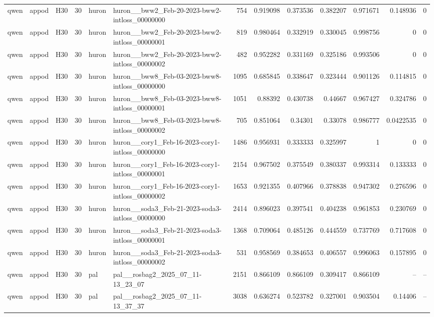 \begin{longtable}{lllrllrrrrrrr}
qwen & appod & H30 & 30 & huron & huron\_\_bww2\_Feb-20-2023-bww2-intloss\_00000000 & 754 & 0.919098 & 0.373536 & 0.382207 & 0.971671 & 0.148936 & 0 \\
qwen & appod & H30 & 30 & huron & huron\_\_bww2\_Feb-20-2023-bww2-intloss\_00000001 & 819 & 0.980464 & 0.332919 & 0.330045 & 0.998756 & 0 & 0 \\
qwen & appod & H30 & 30 & huron & huron\_\_bww2\_Feb-20-2023-bww2-intloss\_00000002 & 482 & 0.952282 & 0.331169 & 0.325186 & 0.993506 & 0 & 0 \\
qwen & appod & H30 & 30 & huron & huron\_\_bww8\_Feb-03-2023-bww8-intloss\_00000000 & 1095 & 0.685845 & 0.338647 & 0.323444 & 0.901126 & 0.114815 & 0 \\
qwen & appod & H30 & 30 & huron & huron\_\_bww8\_Feb-03-2023-bww8-intloss\_00000001 & 1051 & 0.88392 & 0.430738 & 0.44667 & 0.967427 & 0.324786 & 0 \\
qwen & appod & H30 & 30 & huron & huron\_\_bww8\_Feb-03-2023-bww8-intloss\_00000002 & 705 & 0.851064 & 0.34301 & 0.33078 & 0.986777 & 0.0422535 & 0 \\
qwen & appod & H30 & 30 & huron & huron\_\_cory1\_Feb-16-2023-cory1-intloss\_00000000 & 1486 & 0.956931 & 0.333333 & 0.325997 & 1 & 0 & 0 \\
qwen & appod & H30 & 30 & huron & huron\_\_cory1\_Feb-16-2023-cory1-intloss\_00000001 & 2154 & 0.967502 & 0.375549 & 0.380337 & 0.993314 & 0.133333 & 0 \\
qwen & appod & H30 & 30 & huron & huron\_\_cory1\_Feb-16-2023-cory1-intloss\_00000002 & 1653 & 0.921355 & 0.407966 & 0.378838 & 0.947302 & 0.276596 & 0 \\
qwen & appod & H30 & 30 & huron & huron\_\_soda3\_Feb-21-2023-soda3-intloss\_00000000 & 2414 & 0.896023 & 0.397541 & 0.404238 & 0.961853 & 0.230769 & 0 \\
qwen & appod & H30 & 30 & huron & huron\_\_soda3\_Feb-21-2023-soda3-intloss\_00000001 & 1368 & 0.709064 & 0.485126 & 0.444559 & 0.737769 & 0.717608 & 0 \\
qwen & appod & H30 & 30 & huron & huron\_\_soda3\_Feb-21-2023-soda3-intloss\_00000002 & 531 & 0.958569 & 0.384653 & 0.406557 & 0.996063 & 0.157895 & 0 \\
qwen & appod & H30 & 30 & pal & pal\_\_rosbag2\_2025\_07\_11-13\_23\_07 & 2151 & 0.866109 & 0.866109 & 0.309417 & 0.866109 & -- & -- \\
qwen & appod & H30 & 30 & pal & pal\_\_rosbag2\_2025\_07\_11-13\_37\_37 & 3038 & 0.636274 & 0.523782 & 0.327001 & 0.903504 & 0.14406 & -- \\

\end{longtable}
